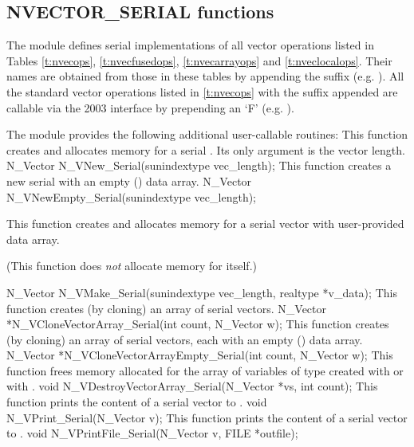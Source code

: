 \subsection{NVECTOR\_SERIAL functions}
\label{ss:nvec_ser_functions}

The {\nvecs} module defines serial implementations of all vector operations listed
in Tables \ref{t:nvecops}, \ref{t:nvecfusedops}, \ref{t:nvecarrayops}
and \ref{t:nveclocalops}. Their
names are obtained from those in these tables by appending the suffix 
(e.g. ).
All the standard vector operations listed in \ref{t:nvecops} with the suffix
 appended are callable via the {\F} 2003 interface by prepending an
`F' (e.g. ).

The module {\nvecs} provides the following additional user-callable routines:
{
  This function creates and allocates memory for a serial .
  Its only argument is the vector length.
}
{
  N\_Vector N\_VNew\_Serial(sunindextype vec\_length);
}
{
  This function creates a new serial  with an empty ()
  data array.
}
{
  N\_Vector N\_VNewEmpty\_Serial(sunindextype vec\_length);
}
{
  This function creates and allocates memory for a serial vector
  with user-provided data array.

  (This function does {\em not} allocate memory for  itself.)
}
{
  N\_Vector N\_VMake\_Serial(sunindextype vec\_length, realtype *v\_data);
}
{
  This function creates (by cloning) an array of  serial vectors.
}
{
  N\_Vector *N\_VCloneVectorArray\_Serial(int count, N\_Vector w);
}
{
  This function creates (by cloning) an array of  serial vectors,
  each with an empty () data array.
}
{
  N\_Vector *N\_VCloneVectorArrayEmpty\_Serial(int count, N\_Vector w);
}
{
  This function frees memory allocated for the array of  variables of type
   created with  or with \newline
  .
}
{
  void N\_VDestroyVectorArray\_Serial(N\_Vector *vs, int count);
}
{
  This function prints the content of a serial vector to .
}
{
  void N\_VPrint\_Serial(N\_Vector v);
}
{
  This function prints the content of a serial vector to .
}
{
  void N\_VPrintFile\_Serial(N\_Vector v, FILE *outfile);
}

